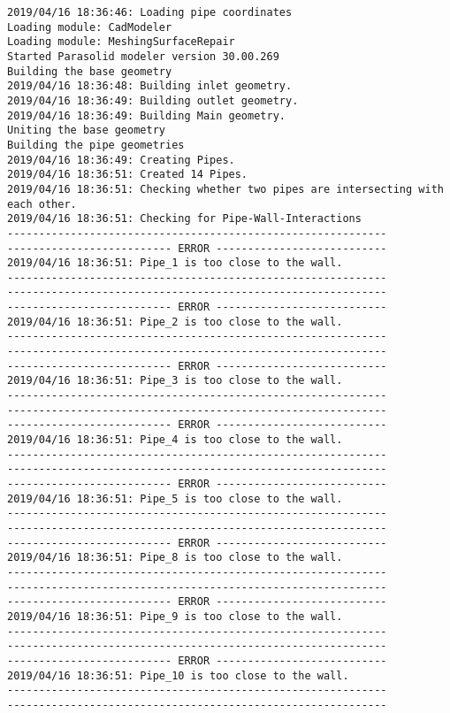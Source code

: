 \documentclass{article}
\begin{document}
{\tiny 
\begin{verbatim}
2019/04/16 18:36:46: Loading pipe coordinates
Loading module: CadModeler
Loading module: MeshingSurfaceRepair
Started Parasolid modeler version 30.00.269
Building the base geometry
2019/04/16 18:36:48: Building inlet geometry.
2019/04/16 18:36:49: Building outlet geometry.
2019/04/16 18:36:49: Building Main geometry.
Uniting the base geometry
Building the pipe geometries
2019/04/16 18:36:49: Creating Pipes.
2019/04/16 18:36:51: Created 14 Pipes.
2019/04/16 18:36:51: Checking whether two pipes are intersecting with each other.
2019/04/16 18:36:51: Checking for Pipe-Wall-Interactions
------------------------------------------------------------
-------------------------- ERROR ---------------------------
2019/04/16 18:36:51: Pipe_1 is too close to the wall.
------------------------------------------------------------
------------------------------------------------------------
-------------------------- ERROR ---------------------------
2019/04/16 18:36:51: Pipe_2 is too close to the wall.
------------------------------------------------------------
------------------------------------------------------------
-------------------------- ERROR ---------------------------
2019/04/16 18:36:51: Pipe_3 is too close to the wall.
------------------------------------------------------------
------------------------------------------------------------
-------------------------- ERROR ---------------------------
2019/04/16 18:36:51: Pipe_4 is too close to the wall.
------------------------------------------------------------
------------------------------------------------------------
-------------------------- ERROR ---------------------------
2019/04/16 18:36:51: Pipe_5 is too close to the wall.
------------------------------------------------------------
------------------------------------------------------------
-------------------------- ERROR ---------------------------
2019/04/16 18:36:51: Pipe_8 is too close to the wall.
------------------------------------------------------------
------------------------------------------------------------
-------------------------- ERROR ---------------------------
2019/04/16 18:36:51: Pipe_9 is too close to the wall.
------------------------------------------------------------
------------------------------------------------------------
-------------------------- ERROR ---------------------------
2019/04/16 18:36:51: Pipe_10 is too close to the wall.
------------------------------------------------------------
------------------------------------------------------------

\end{verbatim}}
\end{document}
